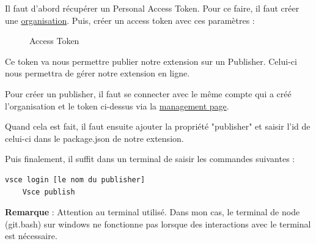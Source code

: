 \documentclass[
    iict, %
    il, %
]{heig-tb}
\begin{document}
Il faut d'abord récupérer un Personal Access Token. Pour ce faire, il faut créer une \href{https://docs.microsoft.com/en-us/azure/devops/organizations/accounts/create-organization?view=azure-devops}{organisation}.
Puis, créer un access token avec ces paramètres :
\begin{figure}[!h]
    \begin{center}
    \end{center}
    \caption[Access Token]{\label{access-token}Access Token}
\end{figure}

Ce token va nous permettre publier notre extension sur un Publisher. Celui-ci nous permettra de gérer notre extension en ligne.

Pour créer un publisher, il faut se connecter avec le même compte qui a créé l'organisation et le token ci-dessus via la \href{https://marketplace.visualstudio.com/manage/publishers/}{management page}.

Quand cela est fait, il faut ensuite ajouter la propriété "publisher" et saisir l'id de celui-ci dans le package.json de notre extension.

Puis finalement, il suffit dans un terminal de saisir les commandes suivantes :
\begin{lstlisting}[frame=single]
    vsce login [le nom du publisher]
    Vsce publish
\end{lstlisting}

\textbf{Remarque} : Attention au terminal utilisé. Dans mon cas, le terminal de node (git.bash) sur windows ne fonctionne pas lorsque des interactions avec le terminal est nécessaire.
\end{document}

